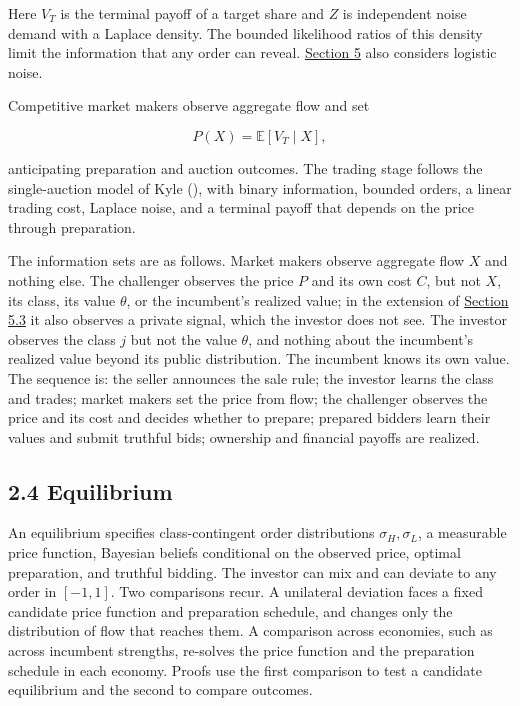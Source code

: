 Here \(V_T\) is the terminal payoff of a target share and \(Z\) is
independent noise demand with a Laplace density. The bounded likelihood
ratios of this density limit the information that any order can reveal.
\hyperref[sec-extensions]{Section 5} also considers logistic noise.

Competitive market makers observe aggregate flow and set

\[
P(X)=\mathbb E[V_T\mid X],
\tag{3}\label{eq:paper-3}
\]

anticipating preparation and auction outcomes. The trading stage follows the single-auction model of Kyle (), with binary information, bounded orders, a linear trading cost, Laplace noise, and a terminal payoff that depends on the price through preparation.


The information sets are as follows. Market makers observe aggregate
flow \(X\) and nothing else. The challenger observes the price \(P\) and
its own cost \(C\), but not \(X\), its class, its value \(\theta\), or
the incumbent's realized value; in the extension of
\hyperref[sec-complementary-private-information]{Section 5.3} it also
observes a private signal, which the investor does not see. The investor
observes the class \(j\) but not the value \(\theta\), and nothing about
the incumbent's realized value beyond its public distribution. The
incumbent knows its own value. The sequence is: the seller announces the
sale rule; the investor learns the class and trades; market makers set
the price from flow; the challenger observes the price and its cost and
decides whether to prepare; prepared bidders learn their values and
submit truthful bids; ownership and financial payoffs are realized.

\subsection{2.4 Equilibrium}\label{sec-equilibrium}

An equilibrium specifies class-contingent order distributions
\(\sigma_H,\sigma_L\), a measurable price function, Bayesian beliefs
conditional on the observed price, optimal preparation, and truthful
bidding. The investor can mix and can deviate to any order in
\([-1,1]\). Two comparisons recur. A unilateral deviation faces a fixed
candidate price function and preparation schedule, and changes only
the distribution of flow that reaches them. A comparison across
economies, such as across incumbent strengths, re-solves the price
function and the preparation schedule in each economy. Proofs use the
first comparison to test a candidate equilibrium and the second to
compare outcomes.

